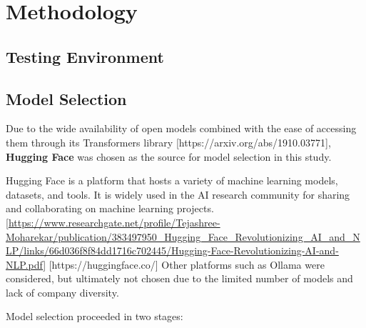 \section{Methodology}

\subsection{Testing Environment}

\subsection{Model Selection}

Due to the wide availability of open models combined with the ease of accessing them through its Transformers library [https://arxiv.org/abs/1910.03771], \textbf{Hugging Face} was chosen as the source for model selection in this study.

Hugging Face is a platform that hosts a variety of machine learning models, datasets, and tools. It is widely used in the AI research community for sharing and collaborating on machine learning projects. [\url{https://www.researchgate.net/profile/Tejashree-Moharekar/publication/383497950_Hugging_Face_Revolutionizing_AI_and_NLP/links/66d036f8f84dd1716c702445/Hugging-Face-Revolutionizing-AI-and-NLP.pdf}] [https://huggingface.co/] Other platforms such as Ollama were considered, but ultimately not chosen due to the limited number of models and lack of company diversity. 

Model selection proceeded in two stages:

